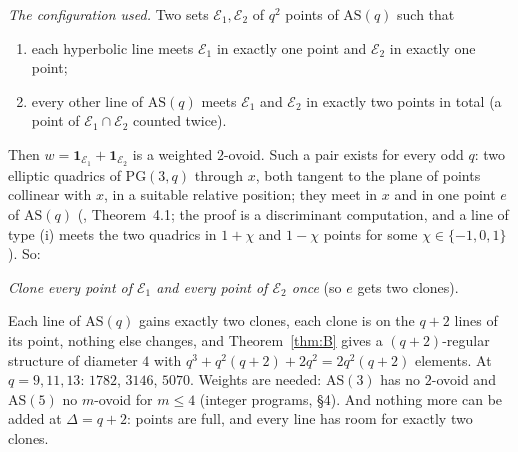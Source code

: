 \documentclass[11pt]{amsart}
\theoremstyle{definition}
\theoremstyle{remark}
\newcommand{\cE}{\mathcal{E}}
\begin{document}
\emph{The configuration used.} Two sets $\cE_1,\cE_2$ of $q^2$ points of $\mathrm{AS}(q)$ such that
\begin{enumerate}[label=\textup{(E\arabic*)},leftmargin=3em]
\item each hyperbolic line meets $\cE_1$ in exactly one point and $\cE_2$ in exactly one point;
\item every other line of $\mathrm{AS}(q)$ meets $\cE_1$ and $\cE_2$ in exactly two points in total \textup{(}a point of $\cE_1\cap\cE_2$ counted twice\textup{)}.
\end{enumerate}
Then $w=\mathbf 1_{\cE_1}+\mathbf 1_{\cE_2}$ is a weighted $2$-ovoid. Such a pair exists for every odd $q$: two elliptic quadrics of $\mathrm{PG}(3,q)$ through $x$, both tangent to the plane of points collinear with $x$, in a suitable relative position; they meet in $x$ and in one point $e$ of $\mathrm{AS}(q)$ (, Theorem~4.1; the proof is a discriminant computation, and a line of type (i) meets the two quadrics in $1+\chi$ and $1-\chi$ points for some $\chi\in\{-1,0,1\}$). So:

\begin{center}
\emph{Clone every point of $\cE_1$ and every point of $\cE_2$ once} (so $e$ gets two clones).
\end{center}
Each line of $\mathrm{AS}(q)$ gains exactly two clones, each clone is on the $q+2$ lines of its point, nothing else changes, and Theorem~\ref{thm:B} gives a $(q+2)$-regular structure of diameter $4$ with $q^3+q^2(q+2)+2q^2=2q^2(q+2)$ elements. At $q=9,11,13$: $1782$, $3146$, $5070$. Weights are needed: $\mathrm{AS}(3)$ has no $2$-ovoid and $\mathrm{AS}(5)$ no $m$-ovoid for $m\le4$ (integer programs,  \S4). And nothing more can be added at $\Delta=q+2$: points are full, and every line has room for exactly two clones.
\end{document}
